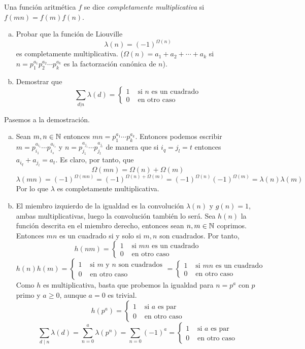 \documentclass[twoside]{article}
\begin{document}
\begin{ejercicio}{6}
Una función aritmética $f$ se dice \textit{completamente multiplicativa} si $f(mn)=f(m)f(n)$.
\begin{enumerate}[(a)]
\item Probar que la función de Liouville
	\[ λ(n) = (-1)^{Ω(n)} \]
	es completamente multiplicativa. ($Ω(n) = a_1+a_2+\cdots+a_k$ si $n=p_1^{a_1}p_2^{a_2}\cdots p_k^{a_k}$ es la factorzación canónica de $n$).
\item Demostrar que
	\[ \sum_{d|n} λ(d) = \begin{cases}
		1 &\text{ si }n\text{ es un cuadrado}\\
		0 &\text{ en otro caso}
	\end{cases}\]
\end{enumerate}
\end{ejercicio}
\begin{solucion}
Pasemos a la demostración.
\begin{enumerate}[(a)]
\item Sean $m,n\in \mathbb{N}$ entonces $mn = p_1^{a_1}\cdots p_k^{a_k}$. Entonces podemos escribir $m=p_{i_1}^{a_{i_1}}\cdots p_{i_s}^{a_{i_s}}$ y $n=p_{j_1}^{a_{j_1}}\cdots p_{j_t}^{a_{j_t}}$ de manera que si $i_q=j_l = t$ entonces $a_{i_q}+a_{j_l}=a_t$. Es claro, por tanto, que 
$$ \Omega(mn) = \Omega(n)+\Omega(m) $$ $$ \lambda(mn) = (-1)^{\Omega(mn)}=(-1)^{ \Omega(n)+\Omega(m)} = (-1)^{\Omega(n)}(-1)^{\Omega(m)} = \lambda(n)\lambda(m)
$$
Por lo que $\lambda$ es completamente multiplicativa.
\item El miembro izquierdo de la igualdad es la convolución $\lambda(n)$ y $g(n)=1$, ambas multiplicativas, luego la convolución también lo será. Sea $h(n)$ la función descrita en el miembro derecho, entonces sean $n,m\in \mathbb{N}$ coprimos. Entonces $mn$ es un cuadrado si y solo si $m,n$ son cuadrados. Por tanto,
$$
h(nm)=\begin{cases}
		1 &\text{ si }mn\text{ es un cuadrado}\\
		0 &\text{ en otro caso}
	\end{cases}
$$
$$h(n)h(m)=\begin{cases}
		1 &\text{ si $m$ y $n$ son cuadrados}\\
		0 &\text{ en otro caso}
	\end{cases}
	=\begin{cases}
		1 &\text{ si $mn$ es un cuadrado}\\
		0 &\text{ en otro caso}
	\end{cases}
$$
\newpage
Como $h$ es multiplicativa, basta que probemos la igualdad para $n=p^a$ con $p$ primo y $a\geq 0$, aunque $a=0$ es trivial. 
$$h(p^a) = \begin{cases}
		1 &\text{ si $a$ es par}\\
		0 &\text{ en otro caso}
	\end{cases}	$$
	$$
	\sum_{d\mid n}\lambda(d) = \sum_{n=0}^a \lambda(p^n) = \sum_{n=0} (-1)^a = \begin{cases}
		1 &\text{ si $a$ es par}\\
		0 &\text{ en otro caso}
	\end{cases}	$$
	\end{enumerate}
\end{solucion}
\newpage
\end{document}
